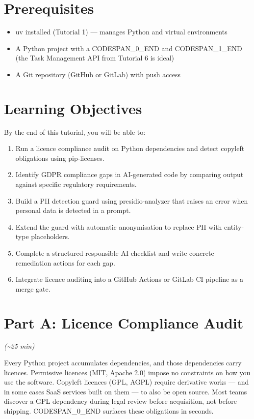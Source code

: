 \documentclass[11pt,a4paper]{book}
\begin{document}
\section{Prerequisites}

\begin{itemize}
  \item uv installed (Tutorial 1) --- manages Python and virtual environments
  \item A Python project with a CODESPAN\_0\_END and CODESPAN\_1\_END (the Task Management API from Tutorial 6 is ideal)
  \item A Git repository (GitHub or GitLab) with push access
\end{itemize}

\medskip

\section{Learning Objectives}

By the end of this tutorial, you will be able to:

\begin{enumerate}
  \item Run a licence compliance audit on Python dependencies and detect copyleft obligations using pip-licenses.
  \item Identify GDPR compliance gaps in AI-generated code by comparing output against specific regulatory requirements.
  \item Build a PII detection guard using presidio-analyzer that raises an error when personal data is detected in a prompt.
  \item Extend the guard with automatic anonymisation to replace PII with entity-type placeholders.
  \item Complete a structured responsible AI checklist and write concrete remediation actions for each gap.
  \item Integrate licence auditing into a GitHub Actions or GitLab CI pipeline as a merge gate.
\end{enumerate}

\medskip

\section{Part A: Licence Compliance Audit}

\textit{(\textasciitilde{}25 min)}

Every Python project accumulates dependencies, and those dependencies carry licences. Permissive licences (MIT, Apache 2.0) impose no constraints on how you use the software. Copyleft licences (GPL, AGPL) require derivative works --- and in some cases SaaS services built on them --- to also be open source. Most teams discover a GPL dependency during legal review before acquisition, not before shipping. CODESPAN\_0\_END surfaces these obligations in seconds.
\end{document}
